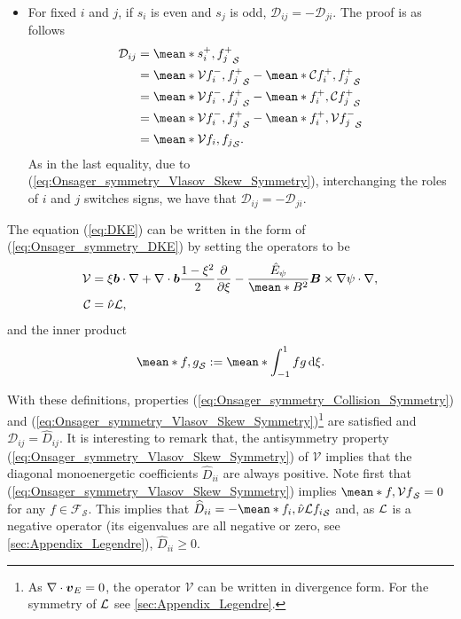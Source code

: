 \begin{itemize}
	\item For fixed $i$ and $j$, if $s_i$ is even and $s_j$ is odd, $\mathcal{D}_{ij} = -\mathcal{D}_{ji}$. The proof is as follows 
	\begin{align*}
		\mathcal{D}_{ij} & = \mean*{s_i^+, f_j^+}_{\mathcal{S}} \\
		& 
		= \mean*{\mathcal{V} f_i^-, f_j^+}_{\mathcal{S}}
		- \mean*{\mathcal{C} f_i^+, f_j^+}_{\mathcal{S}} \\
		& 
		= \mean*{\mathcal{V} f_i^-, f_j^+}_{\mathcal{S}}
		- \mean*{f_i^+, \mathcal{C}  f_j^+}_{\mathcal{S}} \\
		& 
		= \mean*{\mathcal{V} f_i^-, f_j^+}_{\mathcal{S}}
		- \mean*{f_i^+, \mathcal{V}  f_j^-}_{\mathcal{S}} \\
		& 
		= \mean*{\mathcal{V} f_i, f_j}_{\mathcal{S}}.
	\end{align*}
    As in the last equality, due to (\ref{eq:Onsager_symmetry_Vlasov_Skew_Symmetry}), interchanging the roles of $i$ and $j$ switches signs, we have that $\mathcal{D}_{ij} = -\mathcal{D}_{ji}$.

\end{itemize}

The equation (\ref{eq:DKE}) can be written in the form of (\ref{eq:Onsager_symmetry_DKE}) by setting
the operators to be
%
\begin{align}
	\mathcal{V} & = \xi \vb*{b}\cdot \nabla + \nabla\cdot\vb*{b} \frac{1-\xi^2}{2}\pdv{\xi}
	-  \frac{\hat{E}_\psi}{\mean*{B^2}} \vb*{B}\times \nabla \psi \cdot \nabla,
	\\ 
	\mathcal{C} & = \hat{\nu} \Lorentz,
\end{align}
and the inner product
%
\begin{align}
	\mean*{f,g}_{\mathcal{S}}:= \mean*{\int_{-1}^{1}fg\dd{\xi}}.
	\label{eq:Onsager_Inner_Product}
\end{align}

With these definitions, properties (\ref{eq:Onsager_symmetry_Collision_Symmetry}) and (\ref{eq:Onsager_symmetry_Vlasov_Skew_Symmetry})\footnote{As $\nabla \cdot \vb*{v}_E =0$, the operator $\mathcal{V}$ can be written in divergence form. For the symmetry of $\mathcal{L}$ see \ref{sec:Appendix_Legendre}.} are satisfied and $\mathcal{D}_{ij} = \widehat{D}_{ij} $. It is interesting to remark that, the antisymmetry property (\ref{eq:Onsager_symmetry_Vlasov_Skew_Symmetry}) of $\mathcal{V}$ implies that the diagonal monoenergetic coefficients $\widehat{D}_{ii} $ are always positive. Note first that (\ref{eq:Onsager_symmetry_Vlasov_Skew_Symmetry}) implies $\mean*{f, \mathcal{V} f}_{\mathcal{S}} = 0$ for any $f\in \mathcal{F}_{\mathcal{S}}$. This implies that $\widehat{D}_{ii} = - \mean*{f_i, \hat{\nu}\Lorentz f_i}_{\mathcal{S}} $ and, as $\mathcal{L}$ is a negative operator (its eigenvalues are all negative or zero, see \ref{sec:Appendix_Legendre}), $\widehat{D}_{ii} \ge 0$.

